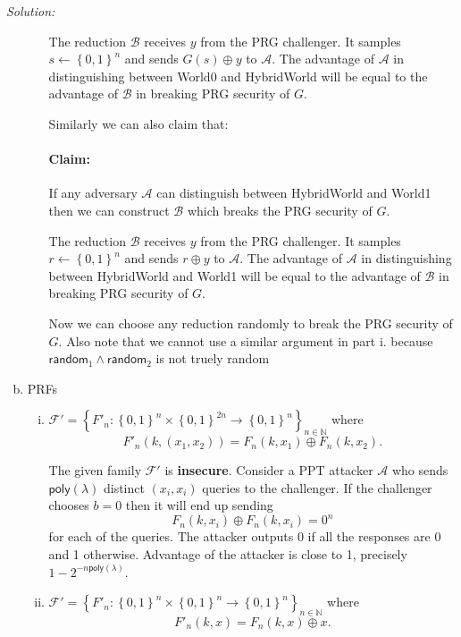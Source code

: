 \documentclass[a4paper, 11pt]{article}
\newenvironment{solution}
    {\textit{Solution:}}
    {\clearpage}
\newcommand{\bit}{\left\{0, 1\right\}}
\newcommand{\poly}{\mathsf{poly}}
\newcommand{\N}{\mathbb{N}}
\newcommand{\calA}{\mathcal{A}}
\newcommand{\calB}{\mathcal{B}}
\newcommand{\calF}{\mathcal{F}}
\newcommand{\set}[1]{\left\{ #1 \right\}}
\begin{document}
\begin{solution}
\begin{enumerate}[(a)]
\begin{enumerate}[i.]
                        The reduction $\calB$ receives $y$ from the PRG challenger. It samples $s\gets\bit^n$ and sends $G(s)\oplus y$ to $\calA$. The advantage of $\calA$ in distinguishing between World0 and HybridWorld will be equal to the advantage of $\calB$ in breaking PRG security of $G$. 
                        
                        Similarly we can also claim that:

                        \paragraph{Claim:} If any adversary $\calA$ can distinguish between HybridWorld and World1 then we can construct $\calB$ which breaks the PRG security of $G$.

                        The reduction $\calB$ receives $y$ from the PRG challenger. It samples $r\gets\bit^n$ and sends $r\oplus y$ to $\calA$. The advantage of $\calA$ in distinguishing between HybridWorld and World1 will be equal to the advantage of $\calB$ in breaking PRG security of $G$.

                        Now we can choose any reduction randomly to break the PRG security of $G$. Also note that we cannot use a similar argument in part i. because $\mathsf{random}_1\wedge\mathsf{random}_2$ is not truely random

              \end{enumerate}
        \item PRFs
              \begin{enumerate}[i.]
                  \item $\calF' = \set{F'_n:\bit^{n} \times \bit^{2n} \to \bit^{n}}_{n\in \N}$ where $$F'_n(k, (x_1, x_2)) = F_n(k, x_1) \oplus F_n(k, x_2).$$

                        The given family $\calF'$ is \textbf{insecure}. Consider a PPT attacker $\calA$ who sends $\poly(\lambda)$ distinct $(x_i,x_i)$ queries to the  challenger. If the challenger chooses $b=0$ then it will end up sending $$F_n(k, x_i) \oplus F_n(k, x_i)=0^n$$ for each of the queries. The attacker outputs 0 if all the responses are 0 and 1 otherwise. Advantage of the attacker is close to 1, precisely $1-2^{-n\poly(\lambda)}$.

                  \item $\calF' = \set{F'_n:\bit^{n} \times \bit^{n} \to \bit^{n}}_{n\in \N}$ where $$F'_n(k, x) = F_n(k, x) \oplus x.$$


\end{enumerate}
\end{enumerate}
\end{solution}
\end{document}
